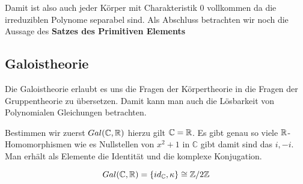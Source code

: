 \documentclass{report}
\begin{document}
 Damit ist also auch jeder Körper mit Charakteristik 0 vollkommen da die irreduziblen Polynome separabel sind. Als Abschluss betrachten wir noch die Aussage des \textbf{Satzes des Primitiven Elements}


\subsection{Galoistheorie} %
\label{sub:galoistheorie}

Die Galoistheorie erlaubt es uns die Fragen der Körpertheorie in die Fragen der Gruppentheorie zu übersetzen. Damit kann man auch die Lösbarkeit von Polynomialen Gleichungen betrachten.


Bestimmen wir zuerst $Gal(\mathbb{C}, \RR)$ hierzu gilt $\mathbb{C} =\RR$. Es gibt genau so viele $\RR$-Homomorphismen wie es Nullstellen von $x^2 +1$ in  $\mathbb{C}$ gibt damit sind das $i,-i$. Man erhält als Elemente die Identität und die komplexe Konjugation.

\begin{equation}
    Gal(\mathbb{C},\RR) = \{ id_\mathbb{C},\kappa \} \cong \ZZ / 2 \ZZ
\end{equation}


\end{document}
